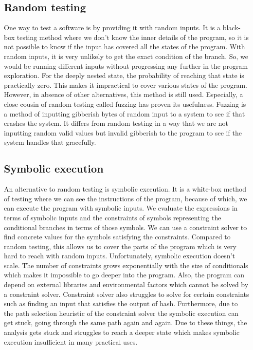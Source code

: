 \documentclass[ runningheads,
               a4paper]{llncs}
\begin{document}
\subsection{Random testing}
One way to test a software is by providing it with random inputs. It is a black-box testing method where we don't know the inner details of the program, so it is not possible to know if the input has covered all the states of the program. With random inputs, it is very unlikely to get the exact condition of the branch. So, we would be running different inputs without progressing any further in the program exploration. For the deeply nested state, the probability of reaching that state is practically zero. This makes it impractical to cover various states of the program. However, in absence of other alternatives, this method is still used. Especially, a close cousin of random testing called fuzzing \cite{miller1990empirical} has proven its usefulness. Fuzzing is a method of inputting gibberish bytes of random input to a system to see if that crashes the system. It differs from random testing in a way that we are not inputting random valid values but invalid gibberish to the program to see if the system handles that gracefully.


\subsection{Symbolic execution}
An alternative to random testing is symbolic execution. It is a white-box method of testing where we can see the instructions of the program, because of which, we can execute the program with symbolic inputs. We evaluate the expressions in terms of symbolic inputs and the constraints of symbols representing the conditional branches in terms of those symbols. We can use a constraint solver to find concrete values for the symbols satisfying the constraints. Compared to random testing, this allows us to cover the parts of the program which is very hard to reach with random inputs. Unfortunately, symbolic execution doesn't scale. The number of constraints grows exponentially with the size of conditionals which makes it impossible to go deeper into the program. Also, the program can depend on external libraries and environmental factors which cannot be solved by a constraint solver. Constraint solver also struggles to solve for certain constraints such as finding an input that satisfies the output of hash. Furthermore, due to the path selection heuristic of the constraint solver the symbolic execution can get stuck, going through the same path again and again. Due to these things, the analysis gets stuck and struggles to reach a deeper state which makes symbolic execution insufficient in many practical uses.
\end{document}
